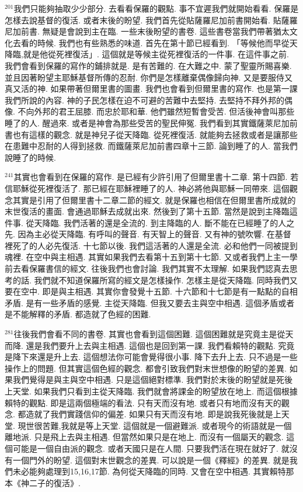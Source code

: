\documentclass{book}
\begin{document}
$^{201}$我們只能夠抽取少少部分.
去看看保羅的觀點.
事不宜遲我們就開始看看.
保羅是怎樣去說基督的復活.
或者末後的盼望.
我們首先從貼薩羅尼加前書開始看.
貼薩羅尼加前書.
無疑是會說到主在臨.
一些末後盼望的書卷.
這些書卷當我們帶著猶太文化去看的時候.
我們也有些熟悉的味道.
首先在第十節已經看到.
「等候他而早從天降臨,就是他從死裡復活」.
這個就是等候主從死裡復活的一件事.
在這件事之前.
我們會看到保羅的寫作的鋪排就是.
是有苦難的.
在大難之中.
蒙了聖靈所賜喜樂.
並且因著盼望主耶穌基督所傳的忍耐.
你們是怎樣離棄偶像歸向神.
又是要服侍又真又活的神.
如果帶著但爾里書的圖畫.
我們也會看到但爾里書的寫作.
也是第一課我們所說的內容.
神的子民怎樣在迫不可避的苦難中去堅持.
去堅持不拜外邦的偶像.
不向外邦的君王屈膝.
而忠於耶和華.
他們雖然短暫會受苦.
但活後神會叫那些睡了的人.
醒過來.
或者是神會為那些受苦的聖民伸冤.
我們看到其實鐵薩萊尼加前書也有這樣的觀念.
就是神兒子從天降臨.
從死裡復活.
就能夠去拯救或者是讓那些在患難中忍耐的人得到拯救.
而鐵薩萊尼加前書四章十三節.
論到睡了的人.
當我們說睡了的時候.

$^{241}$其實也會看到在保羅的寫作.
是已經有少許引用了但爾里書十二章.
第十四節.
若信耶穌從死裡復活了.
那已經在耶穌裡睡了的人.
神必將他與耶穌一同帶來.
這個觀念其實是引用了但爾里書十二章二節的經文.
就是保羅也相信在但爾里書所成就的末世復活的畫面.
會通過耶穌去成就出來.
然後到了第十五節.
當然是說到主降臨這件事.
從天降臨.
我們活著的還是全流的.
到主降臨的人.
斷不能在已經睡了的人之先.
因為主必從天降臨.
有呼叫的聲音.
有天智上的聲音.
又有神的號吹響.
在基督裡死了的人必先復活.
十七節以後.
我們這活著的人還是全流.
必和他們一同被提到魂裡.
在空中與主相遇.
其實如果我們去看第十五到第十七節.
又或者我們上主一學前去看保羅書信的經文.
往後我們也會討論.
我們其實不太理解.
如果我們認真去思考的話.
我們就不知道保羅所寫的經文是怎樣操作.
怎樣主是從天降臨.
同時我們又要在空中.
即是與主相遇.
其實你會發覺十五節.
十六節和十七節是有一點點的自相矛盾.
是有一些矛盾的感覺.
主從天降臨.
但我又要去主與空中相遇.
這個矛盾或者是不能解釋的矛盾.
都造就了色經的困難.

$^{281}$往後我們會看不同的書卷.
其實也會看到這個困難.
這個困難就是究竟主是從天而降.
還是我們要升上去與主相遇.
這個也是回到第一課.
我們看賴特的觀點.
究竟是降下來還是升上去.
這個想法你可能會覺得很小事.
降下去升上去.
只不過是一些操作上的問題.
但其實這個色經的觀念.
都會引致我們對末世想像的盼望的差異.
如果我們覺得是與主與空中相遇.
只是這個絕對標準.
我們對於末後的盼望就是死後上天堂.
如果我們只看到主從天降臨.
我們就會將課金的盼望放在地上.
而這個根據賴特的觀點.
即是這兩個極端的看法.
只有天而沒有地.
或者只有地而沒有天的觀念.
都造就了我們實踐信仰的偏差.
如果只有天而沒有地.
即是說我死後就是上天堂.
現世很苦難,我就是等上天堂.
這個就是一個避難派.
或者現今的術語就是一個離地派.
只是飛上去與主相遇.
但當然如果只是在地上.
而沒有一個屬天的觀念.
這個可能是一個自由派的觀念.
或者天國只是在人間.
只要我們活在現在就好了.
就沒有一個門外的盼望.
這個對末世觀念的差異.
可以說是一個《釋經》的差異.
就是我們未必能夠處理到15,16,17節.
為何從天降臨的同時.
又會在空中相遇.
其實賴特那本《神二子的復活》.
\end{document}
